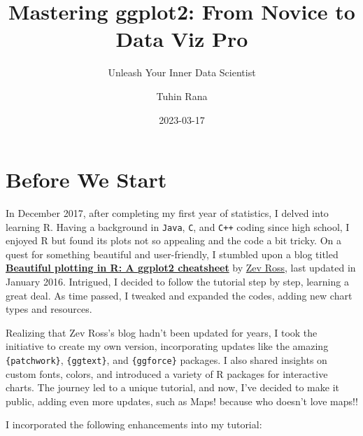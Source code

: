 \documentclass[
  letterpaper,
]{scrbook}
\title{Mastering ggplot2: From Novice to Data Viz Pro}
\subtitle{Unleash Your Inner Data Scientist}
\author{Tuhin Rana}
\date{2023-03-17}
\renewcommand*\contentsname{Table of contents}
\newcommand\contentsname{Table of contents}
\begin{document}
\frontmatter
\maketitle

\renewcommand*\contentsname{Table of Contents}
{
\hypersetup{linkcolor=}
\setcounter{tocdepth}{1}
\tableofcontents
}
\mainmatter
{}

\chapter*{Before We Start}\label{before-we-start}


In December 2017, after completing my first year of statistics, I delved
into learning R. Having a background in \texttt{Java}, \texttt{C}, and
\texttt{C++} coding since high school, I enjoyed R but found its plots
not so appealing and the code a bit tricky. On a quest for something
beautiful and user-friendly, I stumbled upon a blog titled
\href{http://zevross.com/blog/2014/08/04/beautiful-plotting-in-r-a-ggplot2-cheatsheet-3/}{\textbf{Beautiful
plotting in R: A ggplot2 cheatsheet}} by
\href{https://twitter.com/zevross}{Zev Ross}, last updated in January
2016. Intrigued, I decided to follow the tutorial step by step, learning
a great deal. As time passed, I tweaked and expanded the codes, adding
new chart types and resources.

Realizing that Zev Ross's blog hadn't been updated for years, I took the
initiative to create my own version, incorporating updates like the
amazing \texttt{\{patchwork\}}, \texttt{\{ggtext\}}, and
\texttt{\{ggforce\}} packages. I also shared insights on custom fonts,
colors, and introduced a variety of R packages for interactive charts.
The journey led to a unique tutorial, and now, I've decided to make it
public, adding even more updates, such as Maps! because who doesn't love
maps!!

I incorporated the following enhancements into my tutorial:
\end{document}
